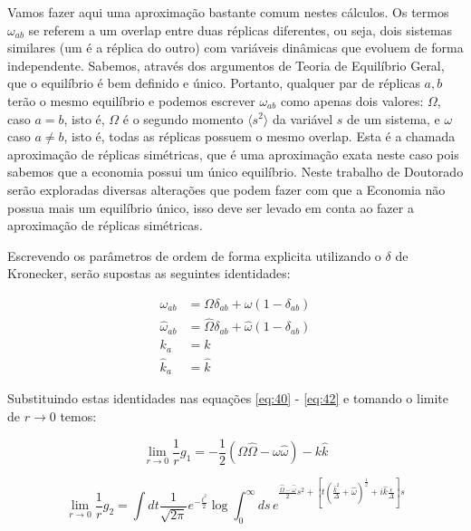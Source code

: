 Vamos fazer aqui uma aproximação bastante comum nestes cálculos. Os
termos $\omega_{ab}$ se referem a um overlap entre duas réplicas
diferentes, ou seja, dois sistemas similares (um é a réplica do outro)
com variáveis dinâmicas que evoluem de forma independente. Sabemos,
através dos argumentos de Teoria de Equilíbrio Geral, que o equilíbrio
é bem definido e único. Portanto, qualquer par de réplicas $a,b$ terão
o mesmo equilíbrio e podemos escrever $\omega_{ab}$ como apenas dois
valores: $\Omega$, caso $a = b$, isto é, $\Omega$ é o segundo momento
$\langle s^2 \rangle$ da variável $s$ de um sistema, e $\omega$ caso
$a\neq b$, isto é, todas as réplicas possuem o mesmo overlap. Esta é a
chamada aproximação de réplicas simétricas, que é uma aproximação
exata neste caso pois sabemos que a economia possui um único
equilíbrio. Neste trabalho de Doutorado serão exploradas diversas
alterações que podem fazer com que a Economia não possua mais um
equilíbrio único, isso deve ser levado em conta ao fazer a aproximação
de réplicas simétricas. 

Escrevendo os parâmetros de ordem de forma explicita utilizando o
$\delta$ de Kronecker, serão supostas as seguintes identidades:

\begin{align}
  \label{eq:44}
  \omega_{ab} & = \Omega \delta_{ab} + \omega (1 - \delta_{ab})
  \nonumber \\
  \hat{\omega}_{ab} & = \hat{\Omega} \delta_{ab} + \hat{\omega}
  (1-\delta_{ab}) \nonumber \\
  k_a & = k \\
  \hat{k}_a & = \hat{k} \nonumber
\end{align}

Substituindo estas identidades nas equações \eqref{eq:40} -
\eqref{eq:42} e tomando o limite de $r\to 0$ temos:

\begin{equation}
  \label{eq:46}
  \lim_{r\to 0} \frac{1}{r} g_1 = -\frac{1}{2}\left(\Omega\hat{\Omega}
    - \omega \hat{\omega}\right) - k\hat{k}
\end{equation}

\begin{equation}
  \label{eq:47}
  \lim_{r\to 0} \frac{1}{r} g_2 = \int dt \frac{1}{\sqrt{2\pi}}
  e^{-\frac{t^2}{2}} \log \int_0^\infty ds \, e^{\frac{\hat{\Omega} -
      \hat{\omega}}{2} s^2 + \left[t\left(\frac{\hat{k}^2}{\Delta} +
      \hat{\omega}\right)^{\frac{1}{2}} +
    i\hat{k}\frac{\epsilon}{\Delta}\right] s}
\end{equation}

